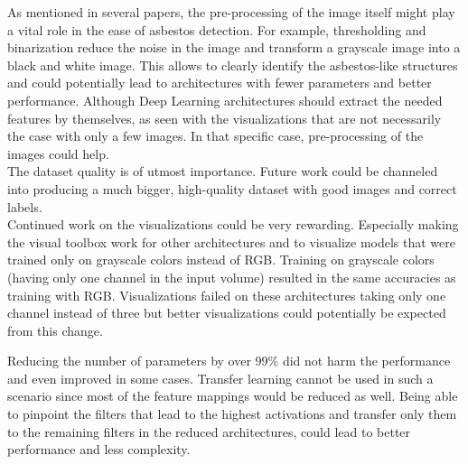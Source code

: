 As mentioned in several papers, the pre-processing of the image itself might play a vital role in the ease of asbestos detection. For example, thresholding and binarization reduce the noise in the image and transform a grayscale image into a black and white image. This allows to clearly identify the asbestos-like structures and could potentially lead to architectures with fewer parameters and better performance. Although Deep Learning architectures should extract the needed features by themselves, as seen with the visualizations that are not necessarily the case with only a few images. In that specific case, pre-processing of the images could help.\\

The dataset quality is of utmost importance. Future work could be channeled into producing a much bigger, high-quality dataset with good images and correct labels.\\

Continued work on the visualizations could be very rewarding. Especially making the visual toolbox work for other architectures and to visualize models that were trained only on grayscale colors instead of RGB. Training on grayscale colors (having only one channel in the input volume) resulted in the same accuracies as training with RGB. Visualizations failed on these architectures taking only one channel instead of three but better visualizations could potentially be expected from this change.\\

\newpage

Reducing the number of parameters by over 99\% did not harm the performance and even improved in some cases. Transfer learning cannot be used in such a scenario since most of the feature mappings would be reduced as well. Being able to pinpoint the filters that lead to the highest activations and transfer only them to the remaining filters in the reduced architectures, could lead to better performance and less complexity.\\

